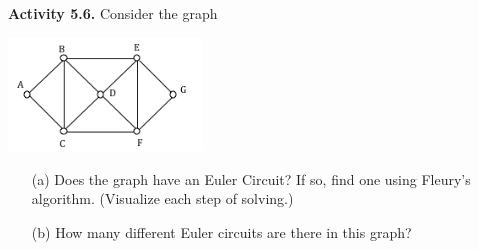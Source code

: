 \documentclass[aspectratio=169]{beamer}
\begin{document}
\begin{frame}[plain]{}
 
 
  {\bf Activity 5.6.} Consider the graph
   \begin{center}
        \includegraphics[height=3cm]{./img/lecture5-fig7.png}  \ \ \ \ \ \ \ \ \ \  \ \ \ \ \ \ \ \ \ \ \ \ \ \ \ \ \ \ \ \ \ \ \ \ \ \ \ \ \ 
      \end{center} 
  \begin{itemize}
    \item[(a)]
  Does the graph have an Euler Circuit? 
   If so, find one using Fleury's algorithm.
   (Visualize each step of solving.)
   \item[(b)] How many different Euler circuits are there in this graph?
 \end{itemize}
 
\end{frame}
\end{document}
